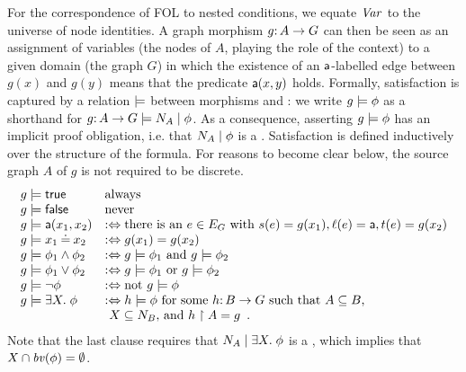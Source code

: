 For the correspondence of FOL to nested conditions, we equate $\mathit{Var}$ to the universe of node identities. A graph morphism $g{:}\, A\rightarrow G$ can then be seen as an assignment of variables (the nodes of $A$, playing the role of the context) to a given domain (the graph $G$) in which the existence of an $\mathsf{a}$-labelled edge between $g(x)$ and $g(y)$ means that the predicate $\mathsf{a}(x,y)$ holds. Formally, satisfaction is captured by a relation $\models$ between morphisms and \cfors: we write $g \models \phi$ as a shorthand for $g {:}\, A \rightarrow G \models {N_A} \mid {\phi}$. As a consequence, asserting $g \models \phi$ has an implicit proof obligation, i.e. that ${N_A} \mid {\phi}$ is a {\cfor}.  Satisfaction is defined inductively over the structure of the formula.
For reasons to become clear below, the source graph $A$ of $g$ is not required to be discrete.
%
\[\begin{array}{ll}
g\models \mathsf{true} & \text{always} \\
g\models \mathsf{false} & \text{never} \\
g\models \mathsf{a}(x_1,x_2) & :\Leftrightarrow \text{there is an } e\in E_G \text{ with } s(e)=g(x_1), \ell(e)=\mathsf{a}, t(e)=g(x_2) \\
g\models x_1\mathbin{\doteq} x_2 & :\Leftrightarrow g(x_1)=g(x_2) \\
g\models \phi_1\wedge \phi_2 & :\Leftrightarrow g\models \phi_1 \text{ and } g\models \phi_2 \\
g\models \phi_1\vee \phi_2 & :\Leftrightarrow g\models \phi_1 \text{ or } g\models \phi_2 \\
g\models \neg\phi & :\Leftrightarrow \text{not } g\models \phi \\
g\models \exists X.\; \phi  & :\Leftrightarrow h\models \phi \text{ for some $h{:}\, B \rightarrow G$ such that $A \subseteq B$,}\\
& \text{ $X \subseteq N_B$, and }  h\restriction A = g\enspace.
\end{array}\]
%
Note that the last clause requires that ${N_A} \mid {\exists X.\;\phi}$ is a {\cfor}, which implies that $X \cap \mathit{bv}(\phi) = \emptyset$.

